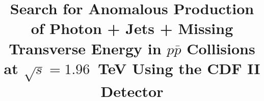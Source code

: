 \documentclass[12pt,twoside,letterpaper,doublespace]{article}
\begin{document}
\def\sla#1{\rlap{\kern .15em /}#1}
\newcommand{\ppbar}{$p\bar{p}$\xspace}
\newcommand{\met}{\mbox{$\sla{E}_T$}\xspace}
\newcommand{\pt}{\mbox{$p_T$}\xspace}
\newcommand{\Ht}{\mbox{$H_T$}\xspace}
\newcommand{\et}{\mbox{$E_T$}\xspace}
\newcommand{\eoverp}{\mbox{$E/p$}\xspace}
\newcommand{\isoetcorr}{\mbox {$E_ {T}^{Iso(corr)}$\xspace }}
\newcommand{\phojets}{\mbox{$\gamma$ + jets}\xspace}
\newcommand{\phoonejet}{\mbox{$\gamma$ + $\geq$1 jet}\xspace}
\newcommand{\photwojet}{\mbox{$\gamma$ + $\geq$2 jet}\xspace}
\newcommand{\phojetsmet}{\mbox{\phojets + \met}\xspace}
\newcommand{\metCorr}{$\sla{E}_T^{corr}$\xspace}
\newcommand{\figScale}{0.35}
\newcommand{\MC}{Monte Carlo}
\newcommand{\pythiaText}{\textsc{pythia}\xspace}
\newcommand{\pizero}{$\pi^{0}$}
\newcommand{\alphas}{$\alpha_s$\xspace}

\pagewiselinenumbers

\title{Search for Anomalous Production of Photon + Jets + Missing Transverse Energy in \ppbar Collisions at $\sqrt{s}=1.96$~TeV Using the CDF II Detector}
% 
\maketitle



\end{document}
